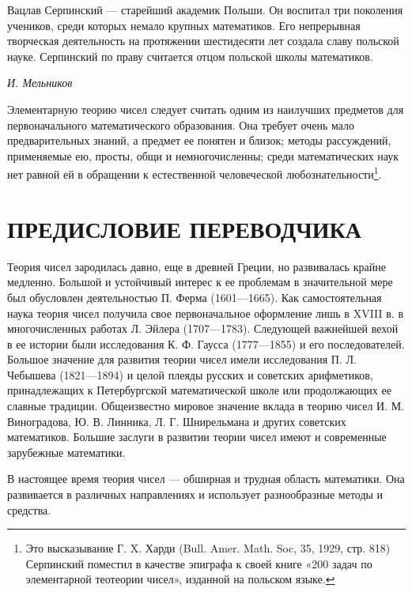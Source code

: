 \documentclass[12pt, a4paper, openany]{book}
\begin{document}
Вацлав Серпинский — старейший академик Польши. Он воспитал три поколения учеников, среди которых немало крупных математиков. Его непрерывная творческая деятельность на протяжении шестидесяти лет создала славу польской науке. Серпинский по праву считается отцом польской школы математиков.

	\begin{flushright}
	\textit{И. Мельников}
\end{flushright}
\newpage



 \hangindent=7.5cm   {\small Элементарную теорию чисел следует считать одним из наилучших предметов для первоначального математического образования. Она требует очень мало предварительных знаний, а предмет ее понятен и близок; методы рассуждений, применяемые ею, просты, общи и немногочисленны; среди математических наук нет равной ей в обращении к естественной человеческой любознательности{\footnote{ Это высказывание Г. X. Харди (Bull. Amer. Math. Soc, 35, 1929, стр. 818) Серпинский поместил в качестве эпиграфа к своей книге «200 задач по элементарной теотеории чисел», изданной на польском языке.}}.}


	\section[Предисловие переводчика]{\center ПРЕДИСЛОВИЕ ПЕРЕВОДЧИКА}

Теория чисел зародилась давно, еще в древней Греции, но развивалась крайне медленно. Большой и устойчивый интерес к ее проблемам в значительной мере был обусловлен деятельностью П. Ферма (1601—1665). Как самостоятельная наука теория чисел получила свое первоначальное оформление лишь в XVIII в. в многочисленных работах Л. Эйлера (1707—1783). Следующей важнейшей вехой в ее истории были исследования К. Ф. Гаусса (1777—1855) и его последователей. Большое значение для развития теории чисел имели исследования П. Л. Чебышева (1821—1894) и целой плеяды русских и советских арифметиков, принадлежащих к Петербургской математической школе или продолжающих ее славные традиции. Общеизвестно мировое значение вклада в теорию чисел И. М. Виноградова, Ю. В. Линника, Л. Г. Шнирельмана и других советских математиков. Большие заслуги в развитии теории чисел имеют и современные зарубежные математики.


В настоящее время теория чисел — обширная и трудная область математики. Она развивается в различных направлениях и использует разнообразные методы и средства.
\end{document}
